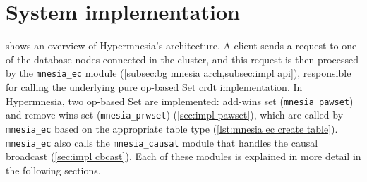 
\section{System implementation} \label{sec:impl}


 shows an overview of Hypermnesia's architecture. 
A client sends a request to one of the database nodes connected in the cluster, 
and this request is then processed by the \verb|mnesia_ec| 
module (\cref{subsec:bg mnesia arch,subsec:impl api}), responsible
for calling the underlying pure op-based Set \acrshort{crdt} implementation.
In Hypermnesia, two op-based Set 
are implemented: add-wins set (\verb|mnesia_pawset|) and remove-wins set (\verb|mnesia_prwset|)
(\cref{sec:impl pawset}), which are called by \verb|mnesia_ec| based on the appropriate
table type (\cref{lst:mnesia ec create table}). 
\verb|mnesia_ec| also calls the \verb|mnesia_causal| module that handles the causal 
broadcast (\cref{sec:impl cbcast}). Each of these modules is explained in more
detail in the following sections.


